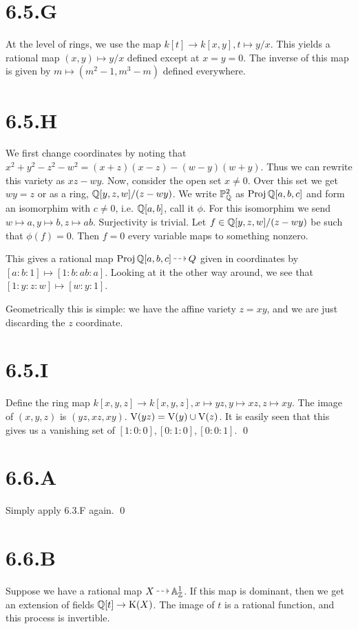 \documentclass{article}
\begin{document}
\section{6.5.G}
At the level of rings, we use the map $k[t] \to k[x, y], t \mapsto
    y/x$. This yields a
rational map $(x, y) \mapsto y/x$ defined except at $x=y=0$.
The inverse of this map is given by $m \mapsto (m^2-1, m^3-m)$ defined everywhere.

\section{6.5.H}
We first change coordinates by noting that $x^2+y^2-z^2-w^2=(x+z)(x-z)-(w-y)(w+y)$. Thus we can
rewrite this variety as $xz-wy$. Now, consider the open set
$x \neq 0$. Over this set we get $wy=z$ or as a
ring, $\mathbb{Q}[y, z, w]/(z-wy)$. We write $\mathbb{P}^2_{\mathbb{Q}}$ as
$\operatorname{Proj} \mathbb{Q}[a, b, c]$ and form an isomorphim with $c \neq 0$,
i.e. $\mathbb{Q}[a, b]$, call it $\phi$. For this
isomorphim we send $w \mapsto a, y \mapsto b, z \mapsto ab$. Surjectivity is trivial. Let
$f \in \mathbb{Q}[y, z, w]/(z-wy)$ be such that $\phi(f)=0$. Then
$f=0$ every variable maps to something nonzero.

This gives a rational map $\Proj \Q[a, b, c] \rationalto Q$ given in coordinates by
$[a : b : 1] \mapsto [1 : b : ab : a]$. Looking at it the other way around, we see that
$[1: y : z : w] \mapsto [w : y : 1]$.

Geometrically this is simple: we have the affine variety
$z=xy$, and we are just discarding the $z$
coordinate.

\section{6.5.I}
Define the ring map $k[x, y, z] \to k[x, y, z], x \mapsto
    yz, y \mapsto xz, z \mapsto xy$. The image of
$(x, y, z)$ is $(yz, xz, xy)$. $\operatorname{V}(yz)=\operatorname{V}(y) \cup \operatorname{V}(z)$. It
is easily seen that this gives us a vanishing set of $[1 : 0 : 0],
    [0 : 1 : 0],
    [0 : 0 : 1]$.
\qed

\section{6.6.A}
Simply apply 6.3.F again. \qed

\section{6.6.B}
Suppose we have a rational map $X \rationalto \A^1_{\Z}$. If this map is
dominant, then we get an extension of fields $\mathbb{Q}[t] \to \operatorname{K}(X)$. The image
of $t$ is a rational function, and this process is
invertible.
\end{document}
